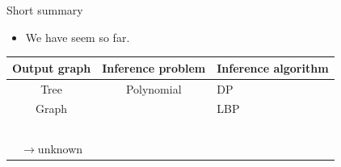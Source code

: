 \documentclass[first=dgreen,second=purple,logo=yellowexc]{aaltoslides}
\begin{document}
\begin{frame}{Short summary}
	\begin{itemize}\footnotesize
		\item We have seem so far.		
	\end{itemize}
		\begin{tabular}{|c|c|p{5.5cm}|}
			\hline
			\footnotesize
			 Output graph & Inference problem & Inference algorithm \\ \hline
			 Tree & Polynomial & DP \cite{Rousu07}  \\
			 Graph & \nphard & LBP \cite{su10structured}  \\ 
			 \daggraph & \nphard & \sdp\ \cite{su14structured} \\ 
			 $\rightarrow${unknown} & \nphard & \mve\ \amm\ \mam\ \cite{su15multilabel} \rta\ \cite{su14multilabelnips} \\ \hline
		\end{tabular}
\end{frame}
\end{document}
